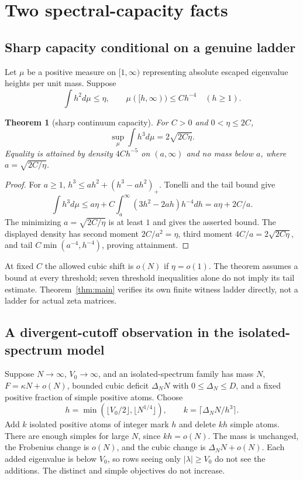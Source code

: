\documentclass[11pt]{article}
\newtheorem{theorem}{Theorem}[section]
\theoremstyle{definition}\newtheorem{definition}[theorem]{Definition}
\theoremstyle{remark}\newtheorem{remark}[theorem]{Remark}
\begin{document}
\section{Two spectral-capacity facts}\label{sec:capacity}
\subsection{Sharp capacity conditional on a genuine ladder}
Let $\mu$ be a positive measure on $[1,\infty)$ representing absolute
escaped eigenvalue heights per unit mass. Suppose
\[
 \int h^2d\mu\le\eta,\qquad
 \mu([h,\infty))\le C h^{-4}\quad(h\ge1).
\]
\begin{theorem}[sharp continuum capacity]\label{thm:capacity}
For $C>0$ and $0<\eta\le2C$,
\[
 \sup_\mu\int h^3d\mu=2\sqrt{2C\eta}.
\]
Equality is attained by density $4Ch^{-5}$ on $(a,\infty)$ and no mass
below $a$, where $a=\sqrt{2C/\eta}$.
\end{theorem}
\begin{proof}
For $a\ge1$, $h^3\le ah^2+(h^3-ah^2)_+$. Tonelli and the tail bound give
\[
 \int h^3d\mu\le a\eta+
 C\int_a^\infty(3h^2-2ah)h^{-4}dh
 =a\eta+2C/a.
\]
The minimizing $a=\sqrt{2C/\eta}$ is at least $1$ and gives the asserted
bound. The displayed density has second moment $2C/a^2=\eta$, third moment
$4C/a=2\sqrt{2C\eta}$, and tail
$C\min(a^{-4},h^{-4})$, proving attainment.
\end{proof}
At fixed $C$ the allowed cubic shift is $o(N)$ if $\eta=o(1)$. The theorem
assumes a bound at every threshold; seven threshold inequalities alone
do not imply its tail estimate. Theorem~\ref{thm:main} verifies its own
finite witness ladder directly, not a ladder for actual zeta matrices.

\subsection{A divergent-cutoff observation in the isolated-spectrum model}
Suppose $N\to\infty$, $V_0\to\infty$, and an isolated-spectrum family has
mass $N$, $F=\kappa N+o(N)$, bounded cubic deficit $\Delta_NN$ with
$0\le\Delta_N\le D$, and a fixed positive fraction of simple positive
atoms. Choose
\[
 h=\min(\lfloor V_0/2\rfloor,\lfloor N^{1/4}\rfloor),
 \qquad k=\lceil\Delta_NN/h^3\rceil.
\]
Add $k$ isolated positive atoms of integer mark $h$ and delete $kh$ simple
atoms. There are enough simples for large $N$, since $kh=o(N)$.
The mass is unchanged, the Frobenius change is $o(N)$, and the cubic
change is $\Delta_NN+o(N)$. Each added eigenvalue is below $V_0$, so rows
seeing only $|\lambda|\ge V_0$ do not see the additions. The distinct and
simple objectives do not increase.
\end{document}
